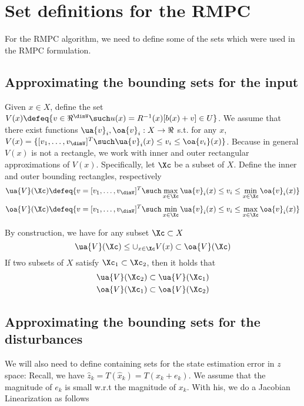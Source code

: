\section{Set definitions for the RMPC}

For the RMPC algorithm, we need to define some of the sets which were used in the RMPC formulation.

\subsection{Approximating the bounding sets for the input}
\label{sec:approx input sets}
Given $x \in X$, define the set $V(x) \defeq \{v \in \Re^{\dimV} \such u(x) = R^{-1}(x)[b(x)+v] \in U\}$.
We assume that there exist functions $\ua{v}_i, \oa{v}_i: X \rightarrow \Re$ s.t. for any $x$, $V(x) = \{[v_1,\ldots,v_{\dimV}]^T \such \ua{v}_i(x) \leq v_i \leq \oa{v_i}(x) \}$.
Because in general $V(x)$ is not a rectangle, we work with inner and outer rectangular approximations of $V(x)$.
Specifically, let $\Xc$ be a subset of $X$.
Define the inner and outer bounding rectangles, respectively
\[\ua{V}(\Xc) \defeq \{v=[v_1,\ldots,v_{\dimV}]^T \such \max_{x\in \Xc} \ua{v}_i(x)  \leq v_i \leq \min_{x \in \Xc} \oa{v}_i(x) \} \]
\[\oa{V}(\Xc) \defeq \{v=[v_1,\ldots,v_{\dimV}]^T \such \min_{x\in \Xc} \ua{v}_i(x)  \leq v_i \leq \max_{x \in \Xc} \oa{v}_i(x) \} \]

By construction, we have for any subset $\Xc \subset X$
\begin{equation}
\label{eq:Vbounds}
\ua{V}(\Xc) \leq \cup_{x \in \Xc} V(x) \subset \oa{V}(\Xc)
\end{equation}
If two subsets of $X$ satisfy $\Xc_1 \subset \Xc_2$, then it holds that 
\begin{eqnarray}
\label{eq:V inclusions}
\ua{V}(\Xc_2) \subset \ua{V}(\Xc_1)
\nonumber
\\
\oa{V}(\Xc_1) \subset \oa{V}(\Xc_2)
\end{eqnarray}


\subsection{Approximating the bounding sets for the disturbances}
\label{sec:approx dist}
We will also need to define containing sets for the state estimation error in $z$ space:
Recall, we have $\hat{z}_k = T(\hat{x}_k) = T(x_k+e_k)$. We assume that the magnitude of $e_k$ is small w.r.t the magnitude of $x_k$. With his, we do a Jacobian Linearization as follows

